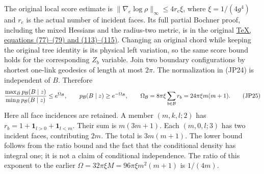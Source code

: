 \documentclass[11pt]{article}
\begin{document}
The original local score estimate is
\(\|\nabla_e\log\rho\|_\infty\le4r_e\xi\), where
\(\xi=1/(4g^4)\) and \(r_e\) is the actual number of incident faces.
Its full partial Bochner proof, including the mixed Hessians and the
radius-two metric, is in the original
\href{https://github.com/KokunoYumeto/yang-mills-interacting-workbench/blob/485b61423c1f4e1805deb453c1b6b342b27842b6/yang-mills/continuations/20260930-s6-ns-moment-map-bridge/sources/spatial/spatial_continuum.tex#L1415}{TeX, equations (77)–(79) and (113)–(115)}.
Changing an original chord while keeping the original tree identity
is its physical left variation, so the same score bound holds for the
corresponding \(Z_b\) variable. Join two boundary configurations by
shortest one-link geodesics of length at most \(2\pi\). The
normalization in (JP24) is independent of \(B\). Therefore
\[
 {\max_B p_{\mathcal B}(B\mid z)\over
       \min_B p_{\mathcal B}(B\mid z)}
 \le e^{\Omega_{\mathcal B}},\qquad
 p_{\mathcal B}(B\mid z)\ge e^{-\Omega_{\mathcal B}},\qquad
 \Omega_{\mathcal B}=8\pi\xi\sum_{b\in\mathcal B}r_b
                   =24\pi\xi m(m+1).
 \tag{JP25}
\]
Here all face incidences are retained. A member \((m,k,l;2)\)
has \(r_b=1+\mathbf1_{l>0}+\mathbf1_{l<m}\). Their sum is
\(m(3m+1)\). Each \((m,0,l;3)\) has two incident faces, contributing
\(2m\). The total is \(3m(m+1)\). The lower bound follows from the
ratio bound and the fact that the conditional density has integral one;
it is not a claim of conditional independence. The ratio of this exponent
to the earlier \(\Omega=32\pi\xi M=96\pi\xi m^2(m+1)\) is \(1/(4m)\).
\end{document}
